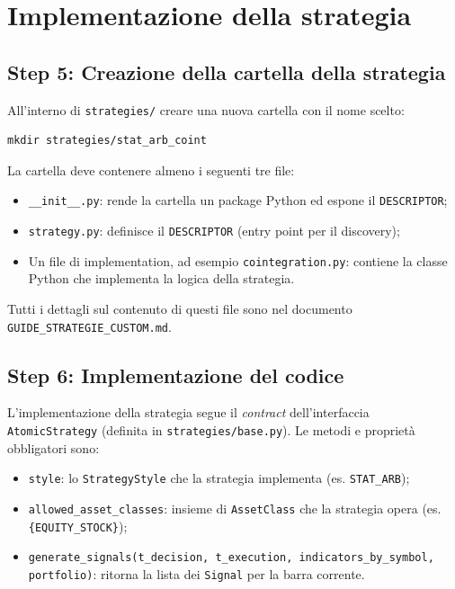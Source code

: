 \section{Implementazione della strategia}

\subsection{Step 5: Creazione della cartella della strategia}

All'interno di \texttt{strategies/} creare una nuova cartella con il nome scelto:

\begin{lstlisting}
mkdir strategies/stat_arb_coint
\end{lstlisting}

La cartella deve contenere almeno i seguenti tre file:

\begin{itemize}
  \item \texttt{\_\_init\_\_.py}: rende la cartella un package Python ed espone il \texttt{DESCRIPTOR};
  \item \texttt{strategy.py}: definisce il \texttt{DESCRIPTOR} (entry point per il discovery);
  \item Un file di implementation, ad esempio \texttt{cointegration.py}: contiene la classe Python che implementa la logica della strategia.
\end{itemize}

Tutti i dettagli sul contenuto di questi file sono nel documento \texttt{GUIDE\_STRATEGIE\_CUSTOM.md}.

\subsection{Step 6: Implementazione del codice}

L'implementazione della strategia segue il \emph{contract} dell'interfaccia \texttt{AtomicStrategy} (definita in \texttt{strategies/base.py}). Le metodi e proprietà obbligatori sono:

\begin{itemize}
  \item \texttt{style}: lo \texttt{StrategyStyle} che la strategia implementa (es. \texttt{STAT\_ARB});
  \item \texttt{allowed\_asset\_classes}: insieme di \texttt{AssetClass} che la strategia opera (es. \texttt{\{EQUITY\_STOCK\}});
  \item \texttt{generate\_signals(t\_decision, t\_execution, indicators\_by\_symbol, portfolio)}: ritorna la lista dei \texttt{Signal} per la barra corrente.
\end{itemize}

